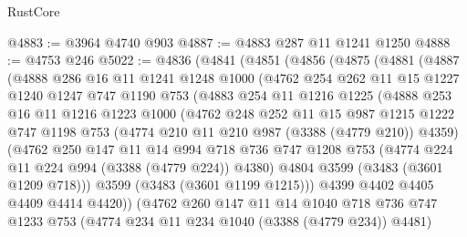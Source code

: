 \begin{lexlean}{RustCore}
\begin{coremodule}
@4883 := @3964 @4740 @903
@4887 := @4883 @287 @11 @1241 @1250
@4888 := @4753 @246
@5022 := @4836
    (@4841
      (@4851
        (@4856
          (@4875
            (@4881
              (@4887
                (@4888
                  @286
                  @16
                  @11
                  @1241
                  @1248
                  @1000
                  (@4762
                    @254
                    @262
                    @11
                    @15
                    @1227
                    @1240
                    @1247
                    @747
                    @1190
                    @753
                    (@4883
                      @254
                      @11
                      @1216
                      @1225
                      (@4888
                        @253
                        @16
                        @11
                        @1216
                        @1223
                        @1000
                        (@4762
                          @248
                          @252
                          @11
                          @15
                          @987
                          @1215
                          @1222
                          @747
                          @1198
                          @753
                          (@4774 @210 @11 @210 @987 (@3388 (@4779 @210)) @4359)
                          (@4762
                            @250
                            @147
                            @11
                            @14
                            @994
                            @718
                            @736
                            @747
                            @1208
                            @753
                            (@4774 @224 @11 @224 @994 (@3388 (@4779 @224)) @4380)
                            @4804
                            @3599
                            (@3483 (@3601 @1209 @718)))
                          @3599
                          (@3483 (@3601 @1199 @1215)))
                        @4399
                        @4402
                        @4405
                        @4409
                        @4414
                        @4420))
                    (@4762
                      @260
                      @147
                      @11
                      @14
                      @1040
                      @718
                      @736
                      @747
                      @1233
                      @753
                      (@4774 @234 @11 @234 @1040 (@3388 (@4779 @234)) @4481)

\end{coremodule}
\end{lexlean}
